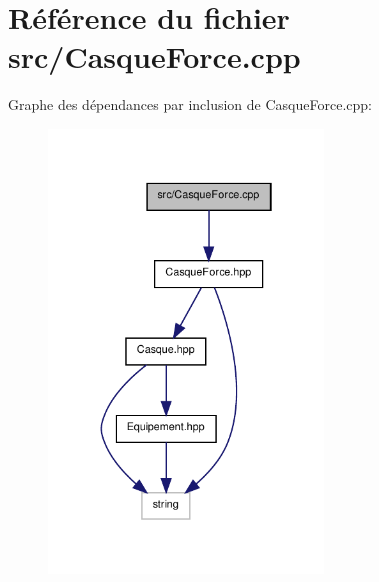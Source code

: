 \section{Référence du fichier src/\-Casque\-Force.cpp}
\label{_casque_force_8cpp}
Graphe des dépendances par inclusion de Casque\-Force.\-cpp\-:\nopagebreak
\begin{figure}[H]
\begin{center}
\leavevmode
\includegraphics[width=207pt]{_casque_force_8cpp__incl}
\end{center}
\end{figure}
